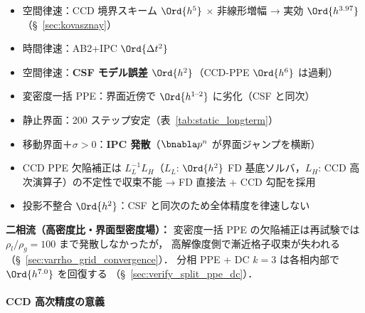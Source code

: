 \begin{description}[style=nextline,leftmargin=2em]
  \item[\textbf{単相 NS ソルバ}（設計精度をほぼ完全に発現）]
    \begin{itemize}[noitemsep]
      \item 空間律速：CCD 境界スキーム $\Ord{h^5}$ $\times$ 非線形増幅 → 実効 $\Ord{h^{3.97}}$（§~\ref{sec:kovasznay}）
      \item 時間律速：AB2+IPC $\Ord{\Delta t^2}$
    \end{itemize}

  \item[\textbf{二相流（$\rho_l/\rho_g \leq 5$，smoothed Heaviside）}]
    \begin{itemize}[noitemsep]
      \item 空間律速：\textbf{CSF モデル誤差 $\Ord{h^2}$}（CCD-PPE $\Ord{h^6}$ は過剰）
      \item 変密度一括 PPE：界面近傍で $\Ord{h^{1\text{--}2}}$ に劣化（CSF と同次）
      \item 静止界面：200 ステップ安定（表~\ref{tab:static_longterm}）
      \item 移動界面＋$\sigma > 0$：\textbf{IPC 発散}（$\bnabla p^n$ が界面ジャンプを横断）
    \end{itemize}

  \item[\textbf{PPE 離散化}]
    \begin{itemize}[noitemsep]
      \item CCD PPE 欠陥補正は $L_L^{-1} L_H$（$L_L$: $\Ord{h^2}$ FD 基底ソルバ，$L_H$: CCD 高次演算子）の不定性で収束不能 → FD 直接法 + CCD 勾配を採用
      \item 投影不整合 $\Ord{h^2}$：CSF と同次のため全体精度を律速しない
    \end{itemize}
\end{description}

\noindent\textbf{二相流（高密度比・界面型密度場）：}
変密度一括 PPE の欠陥補正は再試験では $\rho_l/\rho_g = 100$ まで発散しなかったが，
高解像度側で漸近格子収束が失われる（§~\ref{sec:varrho_grid_convergence}）．
分相 PPE + DC $k{=}3$ は各相内部で $\Ord{h^{7.0}}$ を回復する
（§~\ref{sec:verify_split_ppe_dc}）．

\paragraph{CCD 高次精度の意義}

